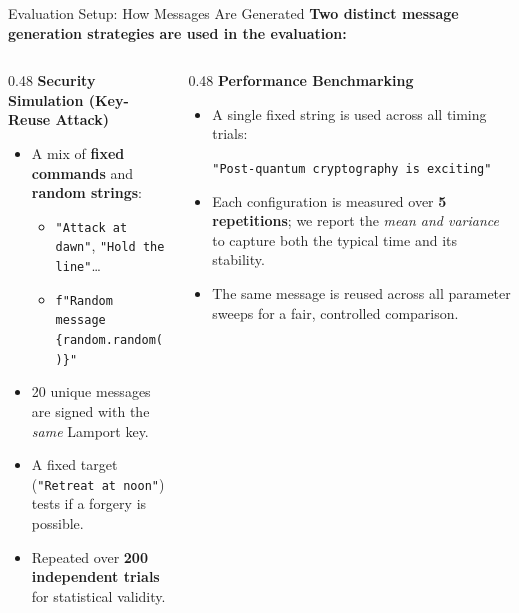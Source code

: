\documentclass[aspectratio=169, 10pt]{beamer}
\begin{document}
\begin{frame}{Evaluation Setup: How Messages Are Generated}
\textbf{Two distinct message generation strategies are used in the evaluation:}

\vspace{8pt}
\begin{columns}

\begin{column}{0.48\textwidth}
\textbf{Security Simulation (Key-Reuse Attack)}
\begin{itemize}
    \item A mix of \textbf{fixed commands} and \textbf{random strings}:
    \begin{itemize}
        \item \small\texttt{"Attack at dawn"}, \texttt{"Hold the line"}\ldots
        \item \small\texttt{f"Random message \{random.random()\}"}
    \end{itemize}
    \item 20 unique messages are signed with the \emph{same} Lamport key.
    \item A fixed target (\texttt{"Retreat at noon"}) tests if a forgery is possible.
    \item Repeated over \textbf{200 independent trials} for statistical validity.
\end{itemize}
\end{column}


\begin{column}{0.48\textwidth}
\textbf{Performance Benchmarking}
\begin{itemize}
    \item A single fixed string is used across all timing trials:
    \begin{block}{}
    \small\texttt{"Post-quantum cryptography is exciting"}
    \end{block}
    \item Each configuration is measured over \textbf{5 repetitions}; we report the \emph{mean and variance} to capture both the typical time and its stability.
    \item The same message is reused across all parameter sweeps for a fair, controlled comparison.
\end{itemize}
\end{column}

\end{columns}
\end{frame}
\end{document}
